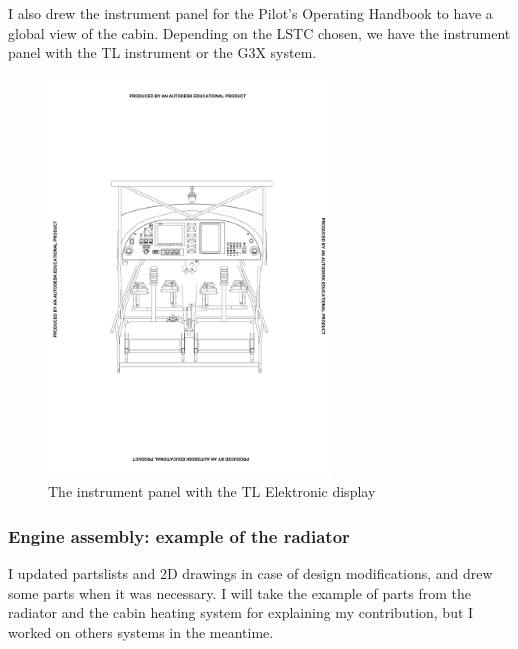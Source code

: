 \documentclass[11pt,a4paper]{article}
\begin{document}
\newpage

I also drew the instrument panel for the Pilot's Operating Handbook to have a global view of the cabin. Depending on the LSTC chosen, we have the instrument panel with the TL instrument or the G3X system.
\begin{figure}[ht!]
	\begin{center}
		\includegraphics[width=7.5cm,trim = 5cm 10cm 5cm 10cm, clip]{pics/PIC006.pdf}
		\caption{The instrument panel with the TL Elektronic display}
		\label{fig:PIC006}
	\end{center}
\end{figure}

\newpage

\subsubsection{Engine assembly: example of the radiator}

I updated partslists and 2D drawings in case of design modifications, and drew some parts when it was necessary. I will take the example of parts from the radiator and the cabin heating system for explaining my contribution, but I worked on others systems in the meantime.
\end{document}
